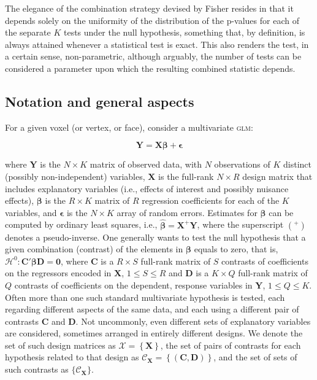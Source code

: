 The elegance of the combination strategy devised by Fisher resides in that it depends solely on the uniformity of the distribution of the p-values for each of the separate $K$ tests under the null hypothesis, something that, by definition, is always attained whenever a statistical test is exact. This also renders the test, in a certain sense, non-parametric, although arguably, the number of tests can be considered a parameter upon which the resulting combined statistic depends.

\subsection{Notation and general aspects}
\label{sec:comb:notation}

For a given voxel (or vertex, or face), consider a multivariate \textsc{glm}:

\begin{equation}
\mathbf{Y} = \mathbf{X}\boldsymbol{\beta} + \boldsymbol{\epsilon}
\label{eqn:glm}
\end{equation}

\noindent
where $\mathbf{Y}$ is the $N \times K$ matrix of observed data, with $N$ observations of $K$ distinct (possibly non-independent) variables, $\mathbf{X}$ is the full-rank $N \times R$ design matrix that includes explanatory variables (i.e., effects of interest and possibly nuisance effects), $\boldsymbol{\beta}$ is the $R \times K$ matrix of $R$ regression coefficients for each of the $K$ variables, and $\boldsymbol{\epsilon}$ is the $N \times K$ array of random errors. Estimates for $\boldsymbol{\beta}$ can be computed by ordinary least squares, i.e., $\boldsymbol{\hat{\beta}} = \mathbf{X}^{+}\mathbf{Y}$, where the superscript $(^{+})$ denotes a pseudo-inverse. One generally wants to test the null hypothesis that a given combination (contrast) of the elements in $\boldsymbol{\beta}$ equals to zero, that is, $\mathcal{H}^{0} : \mathbf{C}'\boldsymbol{\beta}\mathbf{D} = \boldsymbol{0}$, where $\mathbf{C}$ is a $R \times S$ full-rank matrix of $S$ contrasts of coefficients on the regressors encoded in $\mathbf{X}$, $1 \leqslant S \leqslant R$ and $\mathbf{D}$ is a $K \times Q$ full-rank matrix of $Q$ contrasts of coefficients on the dependent, response variables in $\mathbf{Y}$, $1 \leqslant Q \leqslant K$. Often more than one such standard multivariate hypothesis is tested, each regarding different aspects of the same data, and each using a different pair of contrasts $\mathbf{C}$ and $\mathbf{D}$. Not uncommonly, even different sets of explanatory variables are considered, sometimes arranged in entirely different designs. We denote the set of such design matrices as $\mathcal{X} = \left\{\mathbf{X}\right\}$, the set of pairs of contrasts for each hypothesis related to that design as $\mathcal{C}_{\mathbf{X}}=\left\{\left(\mathbf{C},\mathbf{D}\right)\right\}$, and the set of sets of such contrasts as $\{\mathcal{C}_{\mathbf{X}}\}$.

